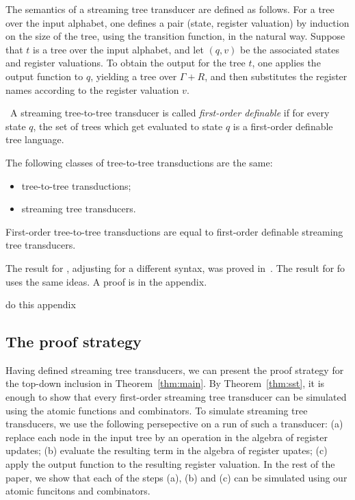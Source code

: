 The semantics of a streaming tree transducer are defined as follows. For a tree over the input alphabet, one defines a pair (state, register valuation)
by induction on the size of the tree, using the transition function, in the natural way. Suppose that $t$  is a tree over the input alphabet, and let $(q,v)$ be the associated states and register  valuations. To obtain the output for the tree $t$, one applies the output function to $q$, yielding a tree over $\Gamma + R$, and then substitutes the register names according to the register valuation $v$. 


\begin{definition}\ 
    A streaming tree-to-tree transducer is called \emph{first-order definable} if for every state $q$, the set of trees which get evaluated to state $q$ is a first-order definable tree language.
\end{definition}    
\begin{theorem}\label{thm:sst}
    The following classes of tree-to-tree transductions are the same:
    \begin{itemize}
        \item  \mso tree-to-tree transductions;
        \item streaming tree transducers.
    \end{itemize}
    First-order  tree-to-tree transductions are equal to first-order definable streaming tree transducers.
\end{theorem}

The result for \mso, adjusting for a different syntax,  was proved in~\cite[Theorem 4.6]{alur2017streaming}. The result for fo uses the same ideas. A proof is in the appendix.
\begin{center}
    do this appendix 
\end{center}

\subsection{The proof strategy}
Having defined streaming tree transducers, we can present the proof strategy for the top-down inclusion in Theorem~\ref{thm:main}. By Theorem~\ref{thm:sst}, it is enough to show that every first-order streaming tree transducer can be simulated using the atomic functions and combinators. To simulate streaming tree transducers, we use the following persepective on a run of such a transducer: (a)  replace each node in the input tree by an operation in the algebra of register updates; (b) evaluate the resulting term in the algebra of register upates; (c) apply the output function to the resulting register valuation. In the rest of the paper, we show that each of the steps (a), (b) and (c) can be simulated using our atomic funcitons and combinators. 

